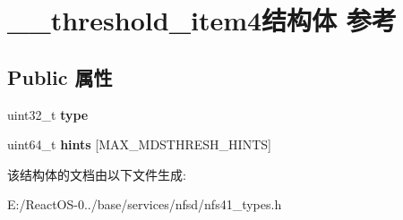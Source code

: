 \hypertarget{struct____threshold__item4}{}\section{\+\_\+\+\_\+threshold\+\_\+item4结构体 参考}
\label{struct____threshold__item4}
\subsection*{Public 属性}
\begin{DoxyCompactItemize}
\item 
\mbox{\label{struct____threshold__item4_aa1f59f64aea231df0a37a7f06840495b}} 
uint32\+\_\+t {\bfseries type}
\item 
\mbox{\label{struct____threshold__item4_a0e8cda9da7475e8a191d15fdf088c853}} 
uint64\+\_\+t {\bfseries hints} \mbox{[}M\+A\+X\+\_\+\+M\+D\+S\+T\+H\+R\+E\+S\+H\+\_\+\+H\+I\+N\+TS\mbox{]}
\end{DoxyCompactItemize}


该结构体的文档由以下文件生成\+:\begin{DoxyCompactItemize}
\item 
E\+:/\+React\+O\+S-\/0../base/services/nfsd/nfs41\+\_\+types.\+h\end{DoxyCompactItemize}
